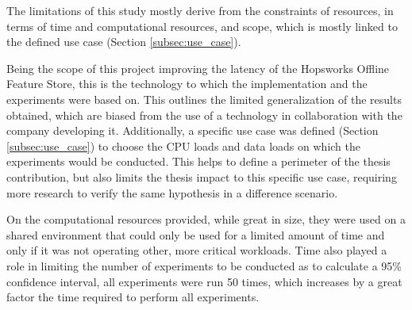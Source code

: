 The limitations of this study mostly derive from the constraints of resources, in terms of time and computational resources, and scope, which is mostly linked to the defined use case (Section \ref{subsec:use_case}). 

Being the scope of this project improving the latency of the Hopsworks Offline Feature Store, this is the technology to which the implementation and the experiments were based on. This outlines the limited generalization of the results obtained, which are biased from the use of a technology in collaboration with the company developing it. Additionally, a specific use case was defined (Section \ref{subsec:use_case}) to choose the \gls{CPU} loads and data loads on which the experiments would be conducted. This helps to define a perimeter of the thesis contribution, but also limits the thesis impact to this specific use case, requiring more research to verify the same hypothesis in a difference scenario.

On the computational resources provided, while great in size, they were used on a shared environment that could only be used for a limited amount of time and only if it was not operating other, more critical workloads. Time also played a role in limiting the number of experiments to be conducted as to calculate a 95\% confidence interval, all experiments were run 50 times, which increases by a great factor the time required to perform all experiments. 